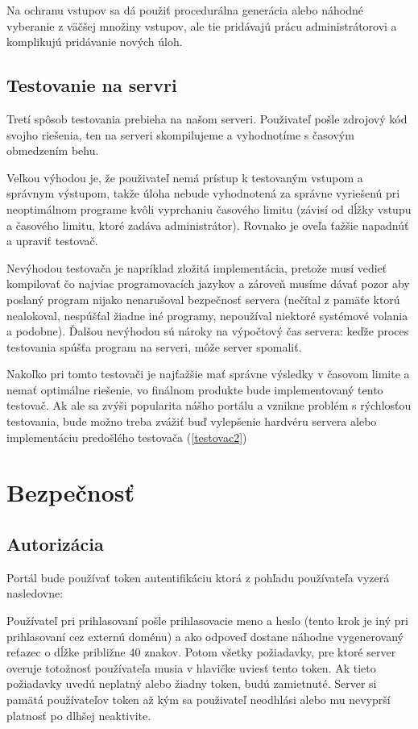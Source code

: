 Na ochranu vstupov sa dá použiť procedurálna generácia alebo náhodné vyberanie z väčšej množiny vstupov, ale tie pridávajú prácu administrátorovi a komplikujú pridávanie nových úloh.

\subsection{Testovanie na servri}
Tretí spôsob testovania prebieha na našom serveri. Použivateľ pošle zdrojový kód svojho riešenia, ten na serveri skompilujeme a vyhodnotíme s časovým obmedzením behu.

Veľkou výhodou je, že použivateľ nemá prístup k testovaným vstupom a správnym výstupom,
takže úloha nebude vyhodnotená za správne vyriešenú pri neoptimálnom programe kvôli vyprchaniu
časového limitu (závisí od dĺžky vstupu a časového limitu, ktoré zadáva administrátor).
Rovnako je oveľa ťažšie napadnúť a upraviť testovač.

Nevýhodou testovača je napríklad zložitá implementácia, pretože musí vedieť kompilovať čo
najviac programovacích jazykov a zároveň musíme dávať pozor aby poslaný program nijako
nenarušoval bezpečnosť servera (nečítal z pamäťe ktorú nealokoval, nespúšťal žiadne iné programy,
nepoužíval niektoré systémové volania a podobne). Ďalšou nevýhodou sú nároky na výpočtový čas servera:
keďže proces testovania spúšťa program na serveri, môže server spomaliť.

Nakoľko pri tomto testovači je najťažšie mať správne výsledky v časovom limite a
nemať optimálne riešenie, vo finálnom produkte bude implementovaný tento testovač. Ak ale sa zvýši
popularita nášho portálu a vznikne problém s rýchlosťou testovania, bude možno treba zvážiť
buď vylepšenie hardvéru servera alebo implementáciu predošlého testovača (\ref{testovac2})

\section{Bezpečnosť}
\subsection{Autorizácia}
\label{authorization}
Portál bude používať token autentifikáciu ktorá z pohľadu používateľa vyzerá nasledovne:

Používateľ pri prihlasovaní pošle prihlasovacie meno a heslo (tento krok je iný pri prihlasovaní cez externú doménu) a ako odpoveď
dostane náhodne vygenerovaný reťazec o dĺžke približne 40 znakov. Potom všetky požiadavky, pre ktoré server overuje totožnosť používateľa
musia v hlavičke uviesť tento token. Ak tieto požiadavky uvedú neplatný alebo žiadny token, budú zamietnuté.
Server si pamätá používateľov token až kým sa použivateľ neodhlási alebo mu nevyprší platnosť po dlhšej neaktivite.

